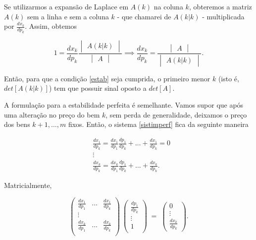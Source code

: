 \documentclass[
	12pt,				%
	openright,			%
	twoside,			%
	a4paper,			%
	english,			%
	french,				%
	spanish,			%
	brazil				%
	]{abntex2}
\begin{document}
Se utilizarmos a expansão de Laplace em $A(k)$ na coluna $k$, obteremos a matriz
$A(k)$ sem a linha e sem a coluna $k$ - que chamarei de $A(k|k)$ - multiplicada por $\frac{dx_k}{dp_k}$.
Assim, obtemos

\begin{equation} \label{laplaceimperf}
	1 =
	\frac{dx_k}{dp_k}
	\frac{\begin{vmatrix}
		A(k|k)
	\end{vmatrix}}
	{\begin{vmatrix}
		A
	\end{vmatrix}}
	\implies
	\frac{dx_k}{dp_k} =
	\frac{\begin{vmatrix}
		A
	\end{vmatrix}}
	{\begin{vmatrix}
		A(k|k)
	\end{vmatrix}}.
\end{equation}

Então, para que a condição \ref{estab} seja cumprida, o primeiro menor $k$
(isto é, $det[A(k|k)]$) tem que possuir sinal oposto a $det[A]$.

A formulação para a estabilidade perfeita é semelhante. Vamos supor que após uma alteração
no preço do bem $k$, sem perda de generalidade, deixamos o preço dos bens
$k + 1, \ldots, m$ fixos. Então, o sistema \ref{sistimperf} fica da seguinte maneira

\begin{equation} \label{sistperf}
	\begin{aligned}
		& \frac{dx_1}{dp_k} = \frac{dx_1}{dp_1}\frac{dp_1}{dp_k} + \ldots + \frac{dx_1}{dp_k}  = 0 \\
		& \vdots \\
		& \frac{dx_k}{dp_k} = \frac{dx_k}{dp_1}\frac{dp_1}{dp_k} + \ldots + \frac{dx_k}{dp_k}.
	\end{aligned}
\end{equation}

Matricialmente,

\begin{equation} \label{matrizperf}
	\begin{pmatrix}
		\frac{dx_1}{dp_1} & \ldots & \frac{dx_1}{dp_k} \\
		\vdots \\
		\frac{dx_k}{dp_1} & \ldots & \frac{dx_k}{dp_k} \\
	\end{pmatrix} \:
	\begin{pmatrix}
		\frac{dp_1}{dp_k} \\
		\vdots \\
		1 \\
	\end{pmatrix} \; = \;
	\begin{pmatrix}
		0 \\
		\vdots \\
		\frac{dx_k}{dp_k}
	\end{pmatrix}
	.
\end{equation}
\end{document}
